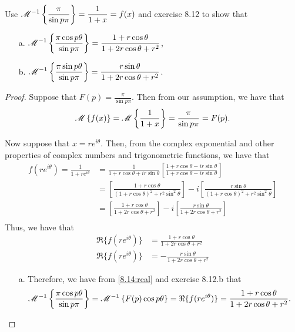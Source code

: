 \begin{problem}{8.14}
  Use $\displaystyle \mathscr{M}^{-1}\left\{ {\frac{\pi}{\sin p\pi}} \right\} = \frac{1}{1+x} = f(x)$ and exercise 8.12
  to show that
  \begin{enumerate}
    \item[a.] $\displaystyle \mathscr{M}^{-1}\left\{ {\frac{\pi \cos p\theta}{\sin p\pi}} \right\} = \frac{1 + r\cos\theta}{1  +2r \cos\theta + r^2}$,
    \item[b.] $\displaystyle \mathscr{M}^{-1}\left\{ {\frac{\pi \sin p\theta}{\sin p\pi}} \right\} = \frac{r\sin\theta}{1  +2r \cos\theta + r^2}$.
  \end{enumerate}
\end{problem}

\begin{proof}
  Suppose that $\displaystyle F(p) = \frac{\pi}{\sin p\pi}$. Then from our assumption, we have that
  \begin{align*}
    \mathscr{M}\left\{ {f(x)} \right\} = \mathscr{M}\left\{ {\frac{1}{1+x}} \right\} = \frac{\pi}{\sin p\pi} = F(p).
  \end{align*}

  Now suppose that $x = re^{i\theta}$. Then, from the complex exponential and other properties of complex numbers and trigonometric functions, we have that
  \begin{align*}
    f(re^{i\theta}) = \frac{1}{1+re^{i\theta}} &= \frac{1}{1 + r\cos\theta + ir\sin\theta}\left[\frac{1 + r\cos\theta - ir\sin\theta}{1 + r\cos\theta - ir\sin\theta}\right] \\
    &= \left[\frac{1 + r\cos\theta}{(1 + r\cos\theta)^2 + r^2\sin^2\theta}\right] -i\left[\frac{r\sin\theta}{(1 + r\cos\theta)^2 + r^2\sin^2\theta}\right] \\
    &= \left[\frac{1 + r\cos\theta}{1 + 2r \cos\theta + r^2}\right] -i\left[\frac{r\sin\theta}{1 + 2r \cos\theta + r^2}\right] \\
  \end{align*}
  Thus, we have that
  \begin{subequations}
    \begin{align}
      \Re{\{f(re^{i\theta})\}} &= \frac{1 + r\cos\theta}{1 + 2r \cos\theta + r^2} \label{8.14:real} \\
      \Re{\{f(re^{i\theta})\}} &= -\frac{r\sin\theta}{1 + 2r \cos\theta + r^2} \label{8.14:imag}
    \end{align}
  \end{subequations}

  \begin{enumerate}
    \item[a.] Therefore, we have from \eqref{8.14:real} and exercise 8.12.b that
      \begin{align*}
        \mathscr{M}^{-1}\left\{ {\frac{\pi \cos p\theta}{\sin p\pi}} \right\} = \mathscr{M}^{-1}\left\{ {F(p)\cos p\theta} \right\} = \Re{\{f(re^{i\theta})\}} = \frac{1 + r\cos\theta}{1  +2r \cos\theta + r^2}.
      \end{align*}


\end{enumerate}
\end{proof}

